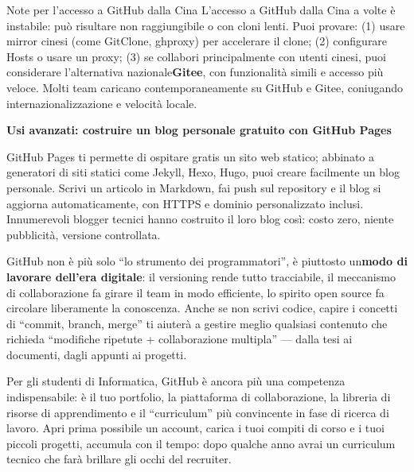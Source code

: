 \begin{tcbinfo}{Note per l'accesso a GitHub dalla Cina}
L'accesso a GitHub dalla Cina a volte è instabile: può risultare non raggiungibile o con cloni lenti. Puoi provare: (1) usare mirror cinesi (come GitClone, ghproxy) per accelerare il clone; (2) configurare Hosts o usare un proxy; (3) se collabori principalmente con utenti cinesi, puoi considerare l'alternativa nazionale\textbf{Gitee}, con funzionalità simili e accesso più veloce. Molti team caricano contemporaneamente su GitHub e Gitee, coniugando internazionalizzazione e velocità locale.

\end{tcbinfo}

\textbf{Usi avanzati: costruire un blog personale gratuito con GitHub Pages}\par

GitHub Pages ti permette di ospitare gratis un sito web statico; abbinato a generatori di siti statici come Jekyll, Hexo, Hugo, puoi creare facilmente un blog personale. Scrivi un articolo in Markdown, fai push sul repository e il blog si aggiorna automaticamente, con HTTPS e dominio personalizzato inclusi. Innumerevoli blogger tecnici hanno costruito il loro blog così: costo zero, niente pubblicità, versione controllata.


GitHub non è più solo “lo strumento dei programmatori”, è piuttosto un\textbf{modo di lavorare dell'era digitale}: il versioning rende tutto tracciabile, il meccanismo di collaborazione fa girare il team in modo efficiente, lo spirito open source fa circolare liberamente la conoscenza. Anche se non scrivi codice, capire i concetti di “commit, branch, merge” ti aiuterà a gestire meglio qualsiasi contenuto che richieda “modifiche ripetute + collaborazione multipla” — dalla tesi ai documenti, dagli appunti ai progetti.

Per gli studenti di Informatica, GitHub è ancora più una competenza indispensabile: è il tuo portfolio, la piattaforma di collaborazione, la libreria di risorse di apprendimento e il “curriculum” più convincente in fase di ricerca di lavoro. Apri prima possibile un account, carica i tuoi compiti di corso e i tuoi piccoli progetti, accumula con il tempo: dopo qualche anno avrai un curriculum tecnico che farà brillare gli occhi del recruiter.

